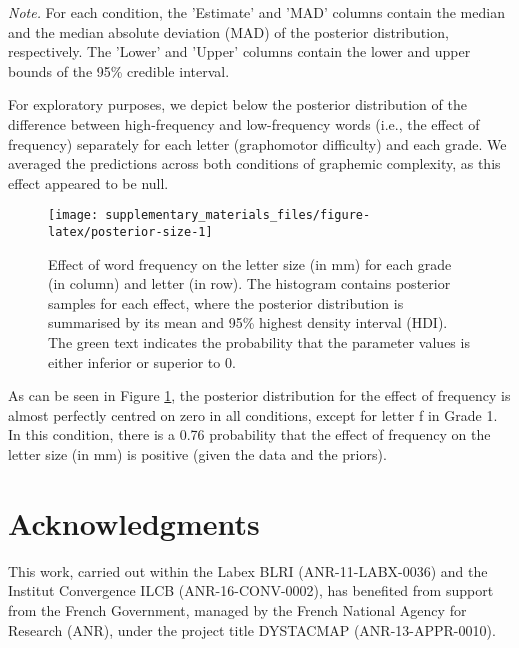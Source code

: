 \documentclass[
  11pt,
  english,
  ,doc,floatsintext]{apa6}
\begin{document}
\begin{table}[htb]
\begin{center}
\begin{threeparttable}
{}

\begin{tablenotes}[para]
\normalsize{\textit{Note.} For each condition, the 'Estimate' and 'MAD' columns contain the
    median and the median absolute deviation (MAD) of the posterior distribution,
    respectively. The 'Lower' and 'Upper' columns contain the lower and upper
    bounds of the 95\% credible interval.}
\end{tablenotes}

\end{threeparttable}
\end{center}

\end{table}

For exploratory purposes, we depict below the posterior distribution of the difference between high-frequency and low-frequency words (i.e., the effect of frequency) separately for each letter (graphomotor difficulty) and each grade. We averaged the predictions across both conditions of graphemic complexity, as this effect appeared to be null.

\begin{figure}[!htb]

{\centering \texttt{[image: supplementary\_materials\_files/figure-latex/posterior-size-1]} 

}

\caption{Effect of word frequency on the letter size (in mm) for each grade (in column) and letter (in row). The histogram contains posterior samples for each effect, where the posterior distribution is summarised by its mean and 95\% highest density interval (HDI). The green text indicates the probability that the parameter values is either inferior or superior to 0.}\label{fig:posterior-size}
\end{figure}

As can be seen in Figure \ref{fig:posterior-size}, the posterior distribution for the effect of frequency is almost perfectly centred on zero in all conditions, except for letter f in Grade 1. In this condition, there is a 0.76 probability that the effect of frequency on the letter size (in mm) is positive (given the data and the priors).

\hypertarget{acknowledgments}{%
\section{Acknowledgments}\label{acknowledgments}}

This work, carried out within the Labex BLRI (ANR-11-LABX-0036) and the Institut Convergence ILCB (ANR-16-CONV-0002), has benefited from support from the French Government, managed by the French National Agency for Research (ANR), under the project title DYSTACMAP (ANR-13-APPR-0010).
\end{document}
